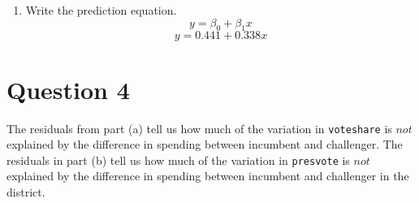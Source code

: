 \documentclass[12pt,letterpaper]{article}
\begin{document}
\begin{enumerate}
			\vspace{2cm}
		\item Write the prediction equation.
		\vspace{.5cm}
			$$y = \beta_0 + \beta_1 x$$
		$$y = 0.441+0.338x$$
	\end{enumerate}
	

\newpage	
\section*{Question 4}
\noindent The residuals from part (a) tell us how much of the variation in \texttt{voteshare} is $not$ explained by the difference in spending between incumbent and challenger. The residuals in part (b) tell us how much of the variation in \texttt{presvote} is $not$ explained by the difference in spending between incumbent and challenger in the district.
\end{document}
